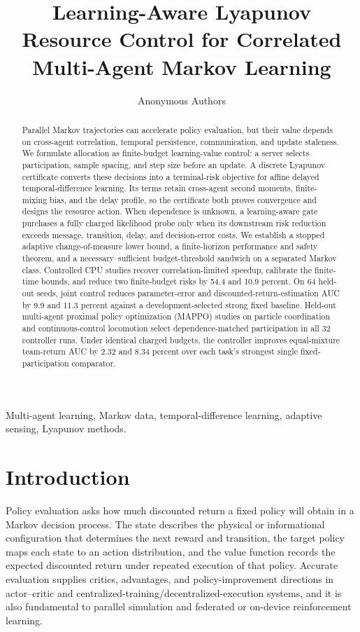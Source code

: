 \documentclass[journal]{IEEEtran}
\title{Learning-Aware Lyapunov Resource Control for Correlated Multi-Agent Markov Learning}
\author{Anonymous Authors}
\begin{document}
\maketitle
\begin{abstract}
Parallel Markov trajectories can accelerate policy evaluation, but their value depends on cross-agent correlation, temporal persistence, communication, and update staleness.
We formulate allocation as finite-budget learning-value control: a server selects participation, sample spacing, and step size before an update.
A discrete Lyapunov certificate converts these decisions into a terminal-risk objective for affine delayed temporal-difference learning.
Its terms retain cross-agent second moments, finite-mixing bias, and the delay profile, so the certificate both proves convergence and designs the resource action.
When dependence is unknown, a learning-aware gate purchases a fully charged likelihood probe only when its downstream risk reduction exceeds message, transition, delay, and decision-error costs.
We establish a stopped adaptive change-of-measure lower bound, a finite-horizon performance and safety theorem, and a necessary--sufficient budget-threshold sandwich on a separated Markov class.
Controlled CPU studies recover correlation-limited speedup, calibrate the finite-time bounds, and reduce two finite-budget risks by 54.4 and 10.9 percent.
On 64 held-out seeds, joint control reduces parameter-error and discounted-return-estimation AUC by 9.9 and 11.3 percent against a development-selected strong fixed baseline.
Held-out multi-agent proximal policy optimization (MAPPO) studies on particle coordination and continuous-control locomotion select dependence-matched participation in all 32 controller runs.
Under identical charged budgets, the controller improves equal-mixture team-return AUC by 2.32 and 8.34 percent over each task's strongest single fixed-participation comparator.
\end{abstract}
\begin{IEEEkeywords}
Multi-agent learning, Markov data, temporal-difference learning, adaptive sensing, Lyapunov methods.
\end{IEEEkeywords}

\section{Introduction}
Policy evaluation asks how much discounted return a fixed policy will obtain in a Markov decision process.
The state describes the physical or informational configuration that determines the next reward and transition, the target policy maps each state to an action distribution, and the value function records the expected discounted return under repeated execution of that policy.
Accurate evaluation supplies critics, advantages, and policy-improvement directions in actor--critic and centralized-training/decentralized-execution systems, and it is also fundamental to parallel simulation and federated or on-device reinforcement learning.
\end{document}
